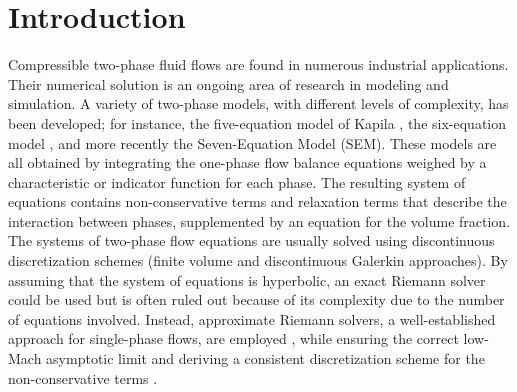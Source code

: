 \documentclass[preprint,10pt]{elsarticle}
\begin{document}
\section{Introduction}\label{sec:intro}
%
Compressible two-phase fluid flows are found in numerous industrial applications. Their numerical solution is an ongoing area of research in modeling and simulation. A variety of two-phase models, with different levels of complexity, has been developed; for instance, the five-equation model of Kapila \cite{Kapila_2001}, the six-equation model \cite{Toumi_1996}, and more recently the Seven-Equation Model  (SEM)\cite{SEM}. These models are all obtained by integrating the one-phase flow balance equations weighed by a characteristic or indicator function for each phase. The resulting system of equations contains non-conservative terms and relaxation terms that describe the interaction between phases, supplemented by an equation for the volume fraction. 
The systems of two-phase flow equations are usually solved using discontinuous discretization schemes (finite volume and discontinuous Galerkin approaches). By assuming that the system of equations is hyperbolic, an exact Riemann solver could be used but is often ruled out because of its complexity due to the number of equations involved. Instead, approximate Riemann solvers, a well-established approach for single-phase flows, are employed \cite{Saurel_2001a, Saurel_2001b, Li_2004, Zein_2010, Ambroso_2012},  while ensuring the correct low-Mach asymptotic limit and deriving a consistent discretization scheme for the non-conservative terms \cite{Li_2004, Abgrall_2002}.
%
\end{document}
